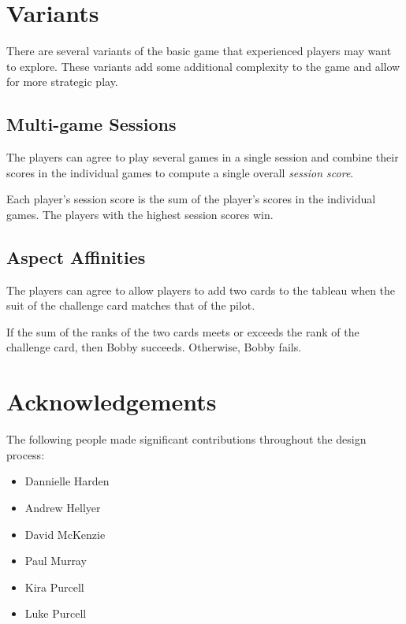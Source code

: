 \documentclass[a4paper, 10pt,notumble]{leaflet}
\begin{document}
\newpage

\section{Variants}
There are several variants of the basic game that experienced players may want to explore. These variants add some additional complexity to the game and allow for more strategic play.

\subsection{Multi-game Sessions}
The players can agree to play several games in a single session and combine their scores in the individual games to compute a single overall \emph{session score}.

Each player's session score is the sum of the player's scores in the individual games. The players with the highest session scores win.
	
\subsection{Aspect Affinities} 
The players can agree to allow players to add two cards to the tableau when the suit of the challenge card matches that of the pilot.

If the sum of the ranks of the two cards meets or exceeds the rank of the challenge card, then Bobby succeeds. Otherwise, Bobby fails.

\vfill

\section{Acknowledgements}
The following people made significant contributions throughout the design process:
\vspace{-1.75ex}
\begin{multicols}{2}
\begin{itemize}[itemsep=0pt, topsep=0pt, partopsep=0pt]
  \item Dannielle Harden
  \item Andrew Hellyer
  \item David McKenzie
  \item Paul Murray
  \item Kira Purcell
  \item Luke Purcell
\end{itemize}
\end{multicols}
\end{document}
